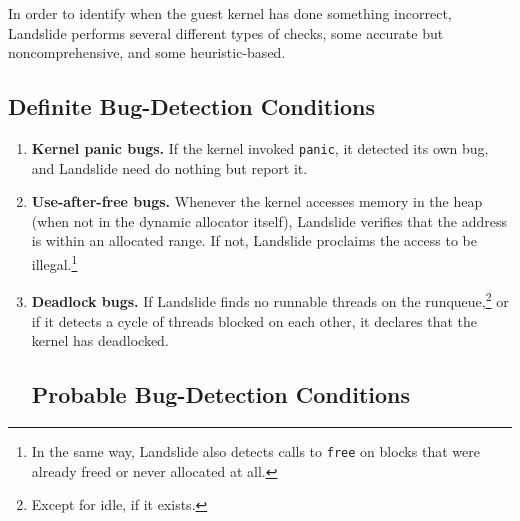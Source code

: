 In order to identify when the guest kernel has done something incorrect, Landslide performs several different types of checks, some accurate but noncomprehensive, and some heuristic-based.

\subsection{Definite Bug-Detection Conditions}

\begin{enumerate}
	\item {\bf Kernel panic bugs.} If the kernel invoked \texttt{panic}, it detected its own bug, and Landslide need do nothing but report it.
	\item {\bf Use-after-free bugs.} Whenever the kernel accesses memory in the heap (when not in the dynamic allocator itself), Landslide verifies that the address is within an allocated range. If not, Landslide proclaims the access to be illegal.\footnote{In the same way, Landslide also detects calls to \texttt{free} on blocks that were already freed or never allocated at all.}
	\item {\bf Deadlock bugs.} If Landslide finds no runnable threads on the runqueue,\footnote{Except for idle, if it exists.} or if it detects a cycle of threads blocked on each other, it declares that the kernel has deadlocked.

\subsection{Probable Bug-Detection Conditions}


\end{enumerate}
